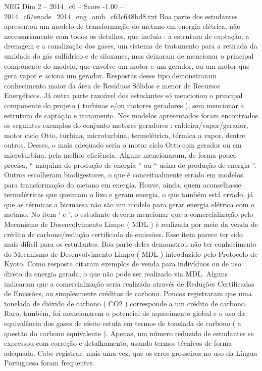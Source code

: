 \begin{textsample}{NEG Dim 2 – 2014\_c6 – Score -1.00 – 2014\_c6/enade\_2014\_eng\_amb\_c63c648bd8.txt}
Boa parte dos estudantes apresentou um modelo de transformação do metano em energia elétrica, não necessariamente com todos os detalhes, que incluía : a estrutura de captação, a drenagem e a canalização dos gases, um sistema de tratamento para a retirada da umidade do gás sulfídrico e de siloxanes, mas deixaram de mencionar o principal componente do modelo, que envolve um motor e um gerador, ou um motor que gera vapor e aciona um gerador.
Respostas desse tipo demonstraram conhecimento maior da área de Resíduos Sólidos e menor de Recursos Energéticos.
Já outra parte razoável dos estudantes só mencionou o principal componente do projeto ( turbinas e/ou motores geradores ), sem mencionar a estrutura de captação e tratamento.
Nos modelos apresentados foram encontrados os seguintes exemplos do conjunto motores geradores : caldeira/vapor/gerador, motor ciclo Otto, turbina, microturbina, termelétrica, térmica a vapor, dentre outros.
Desses, o mais adequado seria o motor ciclo Otto com gerador ou em microturbina, pela melhor eficiência.
Alguns mencionaram, de forma pouco precisa, “ máquina de produção de energia ” ou “ usina de produção de energia ”.
Outros escolheram biodigestores, o que é conceitualmente errado em modelos para transformação do metano em energia.
Houve, ainda, quem aconselhasse termelétricas que queimam o lixo e geram energia, o que também está errado, já que as térmicas a biomassa não são um modelo para gerar energia elétrica com o metano.
No item ‘ c ’, o estudante deveria mencionar que a comercialização pelo Mecanismo de Desenvolvimento Limpo ( MDL ) é realizada por meio da venda de crédito de carbono/redução certificada de emissões.
Esse item parece ter sido mais difícil para os estudantes.
Boa parte deles demonstrou não ter conhecimento do Mecanismo de Desenvolvimento Limpo ( MDL ) introduzido pelo Protocolo de Kyoto.
Como resposta citaram exemplos de venda para indivíduos ou de uso direto da energia gerada, o que não pode ser realizado via MDL.
Alguns indicaram que a comercialização seria realizada através de Reduções Certificadas de Emissões, ou simplesmente créditos de carbono.
Poucos registraram que uma tonelada de dióxido de carbono ( CO2 ) corresponde a um crédito de carbono.
Raro, também, foi mencionarem o potencial de aquecimento global e o uso da equivalência dos gases de efeito estufa em termos de tonelada de carbono ( a questão do carbono equivalente ).
Apenas, um número reduzido de estudantes se expressou com correção e detalhamento, usando termos técnicos de forma adequada.
Cabe registrar, mais uma vez, que os erros grosseiros no uso da Língua Portuguesa foram frequentes.

\end{textsample}
